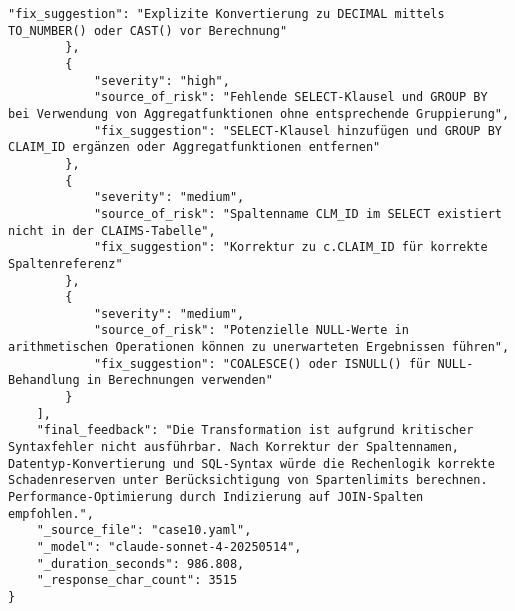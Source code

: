 \begin{lstlisting}[caption={Ausgabe: Claude Sonnet 4 Anwendungsfall 10 Hauptdurchlauf},label={claude_case10_prompt1}]
            "fix_suggestion": "Explizite Konvertierung zu DECIMAL mittels TO_NUMBER() oder CAST() vor Berechnung"
        },
        {
            "severity": "high",
            "source_of_risk": "Fehlende SELECT-Klausel und GROUP BY bei Verwendung von Aggregatfunktionen ohne entsprechende Gruppierung",
            "fix_suggestion": "SELECT-Klausel hinzufügen und GROUP BY CLAIM_ID ergänzen oder Aggregatfunktionen entfernen"
        },
        {
            "severity": "medium",
            "source_of_risk": "Spaltenname CLM_ID im SELECT existiert nicht in der CLAIMS-Tabelle",
            "fix_suggestion": "Korrektur zu c.CLAIM_ID für korrekte Spaltenreferenz"
        },
        {
            "severity": "medium",
            "source_of_risk": "Potenzielle NULL-Werte in arithmetischen Operationen können zu unerwarteten Ergebnissen führen",
            "fix_suggestion": "COALESCE() oder ISNULL() für NULL-Behandlung in Berechnungen verwenden"
        }
    ],
    "final_feedback": "Die Transformation ist aufgrund kritischer Syntaxfehler nicht ausführbar. Nach Korrektur der Spaltennamen, Datentyp-Konvertierung und SQL-Syntax würde die Rechenlogik korrekte Schadenreserven unter Berücksichtigung von Spartenlimits berechnen. Performance-Optimierung durch Indizierung auf JOIN-Spalten empfohlen.",
    "_source_file": "case10.yaml",
    "_model": "claude-sonnet-4-20250514",
    "_duration_seconds": 986.808,
    "_response_char_count": 3515
}
\end{lstlisting}

